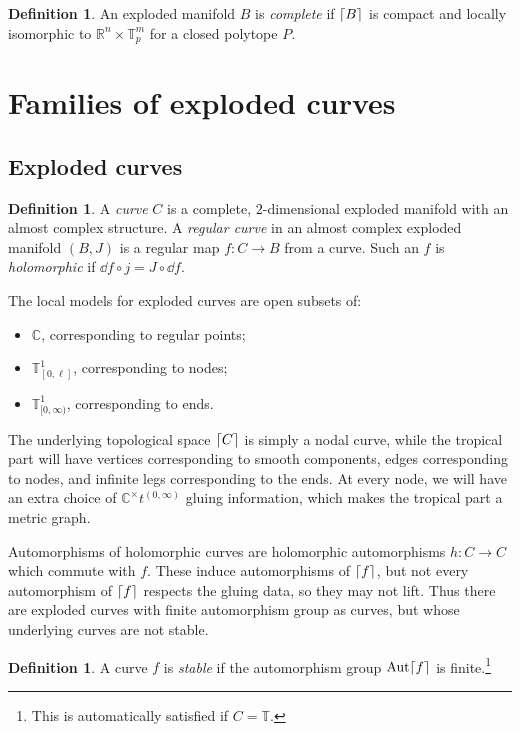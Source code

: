 \documentclass[leqno, openany]{memoir}
\DeclarePairedDelimiter{\ceil}{\lceil}{\rceil}
\theoremstyle{definition}
\newtheorem{defn}[thm]{Definition}
\theoremstyle{remark}
\theoremstyle{plain}
\theoremstyle{definition}
\theoremstyle{remark}
\newcommand{\R}{\mathbb{R}}
\newcommand{\C}{\mathbb{C}}
\newcommand{\T}{\mathbb{T}}
\DeclareMathOperator{\Aut}{Aut}
\begin{document}
\begin{defn}
An exploded manifold $B$ is \textit{complete} if $\ceil{B}$ is compact and locally isomorphic to $\R^n \times \T_p^m$ for a closed polytope $P$.
\end{defn}

\section{Families of exploded curves}
\label{sec:families}

\subsection{Exploded curves}
\label{subsec:curves}

\begin{defn}
A \textit{curve} $C$ is a complete, $2$-dimensional exploded manifold with an almost complex structure. A \textit{regular curve} in an almost complex exploded manifold $(B, J)$ is a regular map $f \colon C \to B$ from a curve. Such an $f$ is \textit{holomorphic} if $\dd{f} \circ j = J \circ \dd{f}$.
\end{defn}

The local models for exploded curves are open subsets of:
\begin{itemize}
\item $\C$, corresponding to regular points;
\item $\T^1_{[0, \ell]}$, corresponding to nodes;
\item $\T^1_{[0, \infty)}$, corresponding to ends.
\end{itemize}
The underlying topological space $\ceil{C}$ is simply a nodal curve, while the tropical part will have vertices corresponding to smooth components, edges corresponding to nodes, and infinite legs corresponding to the ends. At every node, we will have an extra choice of $\C^{\times} t^{(0, \infty)}$ gluing information, which makes the tropical part a metric graph.

Automorphisms of holomorphic curves are holomorphic automorphisms $h \colon C \to C$ which commute with $f$. These induce automorphisms of $\ceil{f}$, but not every automorphism of $\ceil{f}$ respects the gluing data, so they may not lift. Thus there are exploded curves with finite automorphism group as curves, but whose underlying curves are not stable.

\begin{defn}
A curve $f$ is \textit{stable} if the automorphism group $\Aut \ceil{f}$ is finite.\footnote{This is automatically satisfied if $C = \T$.}
\end{defn}
\end{document}
